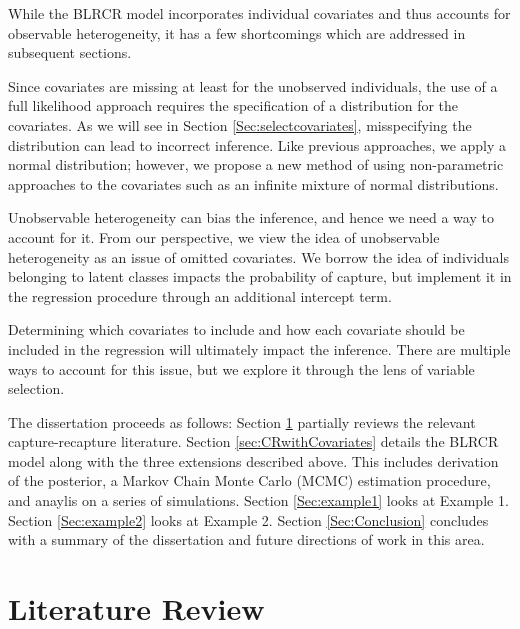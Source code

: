 \documentclass[
  12pt,
]{article}
\begin{document}
While the BLRCR model incorporates individual covariates and thus
accounts for observable heterogeneity, it has a few shortcomings which
are addressed in subsequent sections.

\begin{list}{}{}
\item[1)] Since covariates are missing at least for the unobserved individuals, the use of a full likelihood approach requires the specification of a distribution for the covariates. As we will see in Section \ref{Sec:selectcovariates}, misspecifying the distribution can lead to incorrect inference. Like previous approaches, we apply a normal distribution; however, we propose a new method of using non-parametric approaches to the covariates such as an infinite mixture of normal distributions.

\item[2)] Unobservable heterogeneity can bias the inference, and hence we need a way to account for it. From our perspective, we view the idea of unobservable heterogeneity as an issue of omitted covariates. We borrow the idea of individuals belonging to latent classes impacts the probability of capture\citep{manriquevallier_bayesian_2016}, but implement it in the regression procedure through an additional intercept term. 

\item[3)] Determining which covariates to include and how each covariate should be included in the regression will ultimately impact the inference. There are multiple ways to account for this issue, but we explore it through the lens of variable selection.

\end{list}

The dissertation proceeds as follows: Section \ref{Sec:litreview}
partially reviews the relevant capture-recapture literature. Section
\ref{sec:CRwithCovariates} details the BLRCR model along with the three
extensions described above. This includes derivation of the posterior, a
Markov Chain Monte Carlo (MCMC) estimation procedure, and anaylis on a
series of simulations. Section \ref{Sec:example1} looks at Example 1.
Section \ref{Sec:example2} looks at Example 2. Section
\ref{Sec:Conclusion} concludes with a summary of the dissertation and
future directions of work in this area.

\section{Literature Review}
\label{Sec:litreview}
\end{document}
